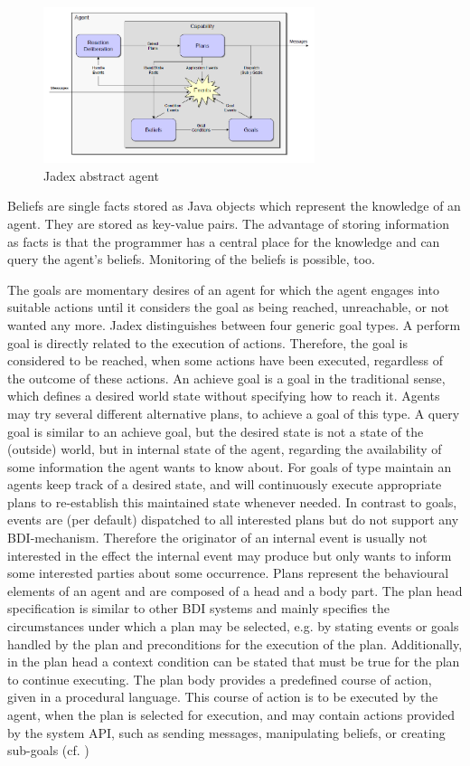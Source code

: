 \begin{figure}
	\centering
	\includegraphics[width=300px]{images/Jadex_agent.png}
	\caption{Jadex abstract agent \cite{Pokahr}}
	\label{fig2}
\end{figure}
Beliefs are single facts stored as Java objects which represent the knowledge of an agent.
They are stored as key-value pairs.
The advantage of storing information as facts is that the programmer has a central place for the knowledge and can query the agent's beliefs.
Monitoring of the beliefs is possible, too.

The goals are momentary desires of an agent for which the agent engages into suitable actions until it considers the goal as being reached, unreachable, or not wanted any more.
Jadex distinguishes between four generic goal types.
A perform goal is directly related to the execution of actions.
Therefore, the goal is considered to be reached, when some actions have been executed, regardless of the outcome of these actions.
An achieve goal is a goal in the traditional sense, which defines a desired world state without specifying how to reach it.
Agents may try several different alternative plans, to achieve a goal of this type.
A query goal is similar to an achieve goal, but the desired state is not a state of the (outside) world, but in internal state of the agent, regarding the availability of some information the agent wants to know about.
For goals of type maintain an agents keep track of a desired state, and will continuously execute appropriate plans to re-establish this maintained state whenever needed.
 In contrast to goals, events are (per default) dispatched to all interested plans but do not support any BDI-mechanism.
Therefore the originator of an internal event is usually not interested in the effect the internal event may produce but only wants to inform some interested parties about some occurrence.
Plans represent the behavioural elements of an agent and are composed of a head and a body part.
The plan head specification is similar to other BDI systems and mainly specifies the circumstances under which a plan may be selected, e.g.
by stating events or goals handled by the plan and preconditions for the execution of the plan.
Additionally, in the plan head a context condition can be stated that must be true for the plan to continue executing.
The plan body provides a predefined course of action, given in a procedural language.
This course of action is to be executed by the agent, when the plan is selected for execution, and may contain actions provided by the system API, such as sending messages, manipulating beliefs, or creating sub-goals (cf. \cite{Pokahr2})


